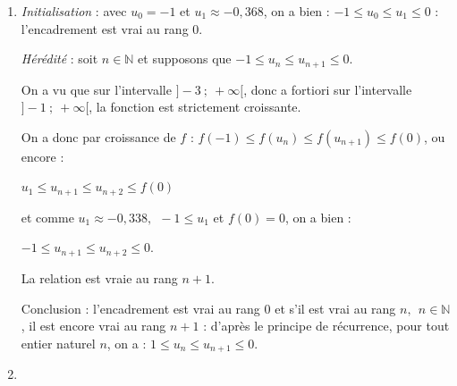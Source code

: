 \documentclass[10pt]{article}
\providecommand{\R}{\mathbb{R}}
\providecommand{\N}{\mathbb{N}}
\providecommand{\e}{{\mathrm{e}}}
\begin{document}
\begin{enumerate}
\begin{enumerate}
$\bullet~~$Quel que soit le réel $x$, \: $x^2 \geqslant 0$ et $\e^x > 0$, donc le signe de $f'(x)$ est celui de $3 + x$ qui s'annule pour $x = - 3$, d'où les deux intervalles de variations ;

$3 + x < 0 \iff x <- 3$ : sur $]- \infty~;~-3[,\: f'(x) < 0$ : la fonction $f$ est donc décroissante sur $]- \infty~;~- 3[$  ;

$3 + x > 0 \iff x >- 3$ : sur $]- 3~;~+\infty[,\: f'(x) > 0$ : la fonction $f$ est donc croissante sur $]- 3~;~+\infty[$ ;

$f(- 3) = (- 3)^3 \times \e^{-3} = - 27\e^{-3} = - \dfrac{27}{\e^3} \approx - 1,344$ est le minimum de la fonction sur $\R$.

$\bullet~~$ On a $f(0) = 0^3 \times \text{e}^0 = 0 \times 1 = 0$ ;

$\bullet~~$ De $\displaystyle\lim_{x \to + \infty} x^3 = + \infty$ et $\displaystyle\lim_{x \to + \infty} \e^{x} = + \infty$, on a par produit de limites

$\displaystyle\lim_{x \to + \infty} f(x) = + \infty$.
		\item 
		

\emph{Initialisation} : avec $u_0 = - 1$ et $u_1 \approx - 0,368$, on a bien : $ - 1 \leqslant u_0 \leqslant u_1  \leqslant 0$ : l'encadrement est vrai au rang $0$.

\emph{Hérédité} : soit $n \in \N$ et supposons que 	$- 1 \leqslant u_n \leqslant u_{n+1} \leqslant 0$.

On a vu que sur l'intervalle $]- 3~;~+\infty[$, donc a fortiori sur l'intervalle $]- 1~;~+ \infty[$, la fonction est strictement croissante.

On a donc par croissance de $f$ : $f(- 1) \leqslant f\left(u_n\right) \leqslant f\left(u_{n+1}\right)\leqslant f(0)$, ou encore :

$u_1\leqslant u_{n+1} \leqslant u_{n+2} \leqslant f(0)$	

et comme $u_1 \approx -0,338, \: \: - 1 \leqslant u_1$ et $f(0) = 0$, on a bien :

$- 1 \leqslant u_{n+1} \leqslant u_{n+2} \leqslant 0$.

La relation est vraie au rang $n + 1$.

Conclusion : l'encadrement est vrai au rang $0$ et s'il est vrai au rang $n,\:\:n \in \N$, il est encore vrai au rang $n + 1$ : d'après le principe de récurrence, pour tout entier naturel $n$, on a :
$1 \leqslant u_n \leqslant u_{n+1} \leqslant 0$.
		\item 
		

\end{enumerate}
\end{enumerate}
\end{document}
